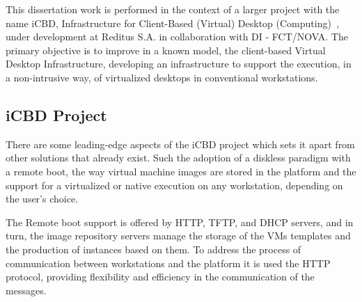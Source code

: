 This dissertation work is performed in the context of a larger project with the name iCBD, Infrastructure for Client-Based (Virtual) Desktop (Computing)~\cite{Lopes2017}, under development at Reditus S.A. in collaboration with DI - FCT/NOVA.
The primary objective is to improve in a known model, the client-based Virtual Desktop Infrastructure, developing an infrastructure to support the execution, in a non-intrusive way, of virtualized desktops in conventional workstations.





\subsection{iCBD Project} %
\label{sub:icbd_project}


There are some leading-edge aspects of the iCBD project which sets it apart from other solutions that already exist. Such the adoption of a diskless paradigm with a remote boot, the way virtual machine images are stored in the platform and the support for a virtualized or native execution on any workstation, depending on the user's choice.~\cite{P2020}

The Remote boot support is offered by HTTP, TFTP, and DHCP servers, and in turn, the image repository servers manage the storage of the VMs templates and the production of instances based on them.
To address the process of communication between workstations and the platform it is used the HTTP protocol, providing flexibility and efficiency in the communication of the messages.~\cite{P2020,Nuno2016,Eduardo2016}

